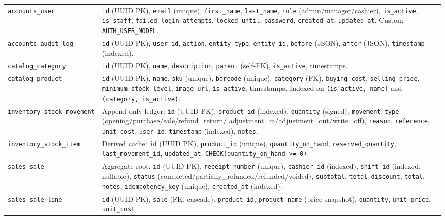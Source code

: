 \documentclass[11pt,a4paper]{article}
\begin{document}
\begin{longtable}{@{}p{}p{}@{}}
\texttt{accounts\_user} & \texttt{id} (UUID PK), \texttt{email} (unique), \texttt{first\_name},
\texttt{last\_name}, \texttt{role} (admin/manager/cashier), \texttt{is\_active},
\texttt{is\_staff}, \texttt{failed\_login\_attempts}, \texttt{locked\_until}, \texttt{password},
\texttt{created\_at}, \texttt{updated\_at}. Custom \texttt{AUTH\_USER\_MODEL}. \\[2pt]
\texttt{accounts\_audit\_log} & \texttt{id} (UUID PK), \texttt{user\_id}, \texttt{action},
\texttt{entity\_type}, \texttt{entity\_id}, \texttt{before} (JSON), \texttt{after} (JSON),
\texttt{timestamp} (indexed). \\[2pt]
\texttt{catalog\_category} & \texttt{id} (UUID PK), \texttt{name}, \texttt{description},
\texttt{parent} (self-FK), \texttt{is\_active}, timestamps. \\[2pt]
\texttt{catalog\_product} & \texttt{id} (UUID PK), \texttt{name}, \texttt{sku} (unique),
\texttt{barcode} (unique), \texttt{category} (FK), \texttt{buying\_cost}, \texttt{selling\_price},
\texttt{minimum\_stock\_level}, \texttt{image\_url}, \texttt{is\_active}, timestamps.
Indexed on \texttt{(is\_active, name)} and \texttt{(category, is\_active)}. \\[2pt]
\texttt{inventory\_stock\_movement} & Append-only ledger: \texttt{id} (UUID PK), \texttt{product\_id}
(indexed), \texttt{quantity} (signed), \texttt{movement\_type} (opening/purchase/sale/refund\_return/
adjustment\_in/adjustment\_out/write\_off), \texttt{reason}, \texttt{reference}, \texttt{unit\_cost},
\texttt{user\_id}, \texttt{timestamp} (indexed), \texttt{notes}. \\[2pt]
\texttt{inventory\_stock\_item} & Derived cache: \texttt{id} (UUID PK), \texttt{product\_id} (unique),
\texttt{quantity\_on\_hand}, \texttt{reserved\_quantity}, \texttt{last\_movement\_id},
\texttt{updated\_at}. \texttt{CHECK(quantity\_on\_hand >= 0)}. \\[2pt]
\texttt{sales\_sale} & Aggregate root: \texttt{id} (UUID PK), \texttt{receipt\_number} (unique),
\texttt{cashier\_id} (indexed), \texttt{shift\_id} (indexed, nullable), \texttt{status}
(completed/partially\_refunded/refunded/voided), \texttt{subtotal}, \texttt{total\_discount},
\texttt{total}, \texttt{notes}, \texttt{idempotency\_key} (unique), \texttt{created\_at} (indexed). \\[2pt]
\texttt{sales\_sale\_line} & \texttt{id} (UUID PK), \texttt{sale} (FK, cascade), \texttt{product\_id},
\texttt{product\_name} (price snapshot), \texttt{quantity}, \texttt{unit\_price}, \texttt{unit\_cost},

\end{longtable}
\end{document}
